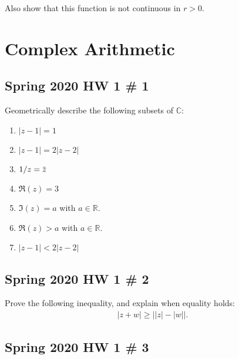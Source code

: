 Also show that this function is not continuous in \(r>0\).

\hypertarget{complex-arithmetic}{%
\section{Complex Arithmetic}\label{complex-arithmetic}}

\hypertarget{spring-2020-hw-1-1}{%
\subsection{Spring 2020 HW 1 \# 1}\label{spring-2020-hw-1-1}}

Geometrically describe the following subsets of \({\mathbb{C}}\):

\begin{enumerate}
\def\labelenumi{\alph{enumi}.}
\tightlist
\item
  \({\left\lvert {z-1} \right\rvert} = 1\)
\item
  \({\left\lvert {z-1} \right\rvert} = 2{\left\lvert {z-2} \right\rvert}\)
\item
  \(1/z = \mkern 1.5mu\overline{\mkern-1.5muz\mkern-1.5mu}\mkern 1.5mu\)
\item
  \(\Re(z) = 3\)
\item
  \(\Im(z) = a\) with \(a\in {\mathbb{R}}\).
\item
  \(\Re(z) > a\) with \(a\in {\mathbb{R}}\).
\item
  \({\left\lvert {z-1} \right\rvert} < 2{\left\lvert {z-2} \right\rvert}\)
\end{enumerate}

\hypertarget{spring-2020-hw-1-2}{%
\subsection{Spring 2020 HW 1 \# 2}\label{spring-2020-hw-1-2}}

Prove the following inequality, and explain when equality holds:
\begin{align*}
{\left\lvert {z+w} \right\rvert} \geq {\left\lvert { {\left\lvert {z} \right\rvert} - {\left\lvert {w} \right\rvert} } \right\rvert}
.\end{align*}

\hypertarget{spring-2020-hw-1-3}{%
\subsection{Spring 2020 HW 1 \# 3}\label{spring-2020-hw-1-3}}

